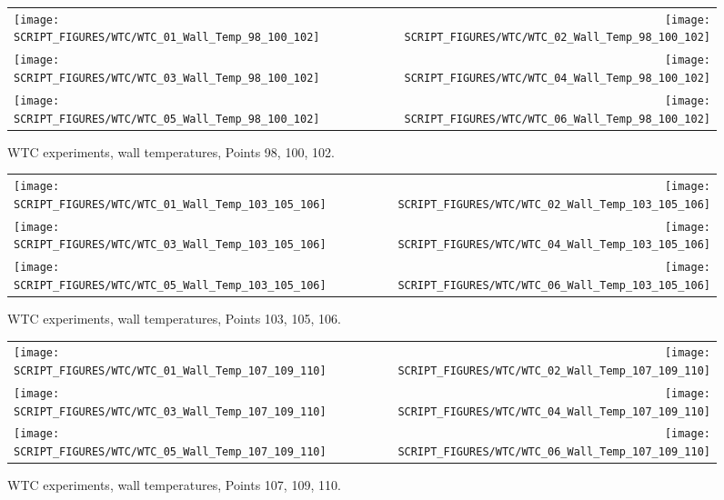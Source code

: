 \begin{figure}[p]
\begin{tabular*}{\textwidth}{l@{\extracolsep{\fill}}r}
\texttt{[image: SCRIPT\_FIGURES/WTC/WTC\_01\_Wall\_Temp\_98\_100\_102]} &
\texttt{[image: SCRIPT\_FIGURES/WTC/WTC\_02\_Wall\_Temp\_98\_100\_102]} \\
\texttt{[image: SCRIPT\_FIGURES/WTC/WTC\_03\_Wall\_Temp\_98\_100\_102]} &
\texttt{[image: SCRIPT\_FIGURES/WTC/WTC\_04\_Wall\_Temp\_98\_100\_102]} \\
\texttt{[image: SCRIPT\_FIGURES/WTC/WTC\_05\_Wall\_Temp\_98\_100\_102]} &
\texttt{[image: SCRIPT\_FIGURES/WTC/WTC\_06\_Wall\_Temp\_98\_100\_102]}
\end{tabular*}
\caption[WTC experiments, wall temperatures, Points 98, 100, 102]{WTC experiments, wall temperatures, Points 98, 100, 102.}
\label{NIST_WTC_Wall_98_100_102}
\end{figure}

\begin{figure}[p]
\begin{tabular*}{\textwidth}{l@{\extracolsep{\fill}}r}
\texttt{[image: SCRIPT\_FIGURES/WTC/WTC\_01\_Wall\_Temp\_103\_105\_106]} &
\texttt{[image: SCRIPT\_FIGURES/WTC/WTC\_02\_Wall\_Temp\_103\_105\_106]} \\
\texttt{[image: SCRIPT\_FIGURES/WTC/WTC\_03\_Wall\_Temp\_103\_105\_106]} &
\texttt{[image: SCRIPT\_FIGURES/WTC/WTC\_04\_Wall\_Temp\_103\_105\_106]} \\
\texttt{[image: SCRIPT\_FIGURES/WTC/WTC\_05\_Wall\_Temp\_103\_105\_106]} &
\texttt{[image: SCRIPT\_FIGURES/WTC/WTC\_06\_Wall\_Temp\_103\_105\_106]}
\end{tabular*}
\caption[WTC experiments, wall temperatures, Points 103, 105, 106]{WTC experiments, wall temperatures, Points 103, 105, 106.}
\label{NIST_WTC_Wall_103_105_106}
\end{figure}

\begin{figure}[p]
\begin{tabular*}{\textwidth}{l@{\extracolsep{\fill}}r}
\texttt{[image: SCRIPT\_FIGURES/WTC/WTC\_01\_Wall\_Temp\_107\_109\_110]} &
\texttt{[image: SCRIPT\_FIGURES/WTC/WTC\_02\_Wall\_Temp\_107\_109\_110]} \\
\texttt{[image: SCRIPT\_FIGURES/WTC/WTC\_03\_Wall\_Temp\_107\_109\_110]} &
\texttt{[image: SCRIPT\_FIGURES/WTC/WTC\_04\_Wall\_Temp\_107\_109\_110]} \\
\texttt{[image: SCRIPT\_FIGURES/WTC/WTC\_05\_Wall\_Temp\_107\_109\_110]} &
\texttt{[image: SCRIPT\_FIGURES/WTC/WTC\_06\_Wall\_Temp\_107\_109\_110]}
\end{tabular*}
\caption[WTC experiments, wall temperatures, Points 107, 109, 110]{WTC experiments, wall temperatures, Points 107, 109, 110.}
\label{NIST_WTC_Wall_107_109_110}
\end{figure}


